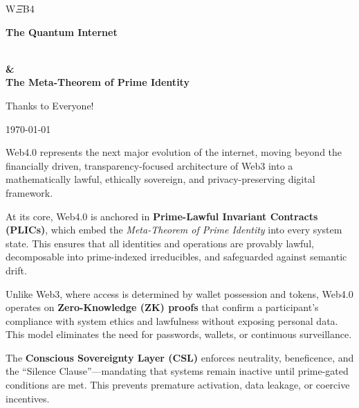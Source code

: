 \documentclass[12]{amsart}
\theoremstyle{plain}
\begin{document}
\begin{titlepage}
    \centering
 
    
    {\Huge\bfseries
    
   W$\Xi$B4

   \par}
\vspace*{1em}
  \Huge\textbf{The Quantum Internet}
   \vspace*{0.5em}
  {\LARGE\bfseries \\ \& \\The Meta-Theorem of Prime Identity \par}

    \vspace{2cm}

     \vspace{1cm}
     \Huge{Thanks to Everyone!  \par}
      \vspace{1cm}
    {\normalsize \today \par}

    \vfill

   
    \vspace{0.5em}
    \begin{minipage}{0.85\textwidth}
        \small
Web4.0 represents the next major evolution of the internet, moving beyond the financially driven, transparency-focused architecture of Web3 into a mathematically lawful, ethically sovereign, and privacy-preserving digital framework.

At its core, Web4.0 is anchored in \textbf{Prime-Lawful Invariant Contracts (PLICs)}, which embed the \emph{Meta-Theorem of Prime Identity} into every system state. This ensures that all identities and operations are provably lawful, decomposable into prime-indexed irreducibles, and safeguarded against semantic drift.

Unlike Web3, where access is determined by wallet possession and tokens, Web4.0 operates on \textbf{Zero-Knowledge (ZK) proofs} that confirm a participant's compliance with system ethics and lawfulness without exposing personal data. This model eliminates the need for passwords, wallets, or continuous surveillance.

The \textbf{Conscious Sovereignty Layer (CSL)} enforces neutrality, beneficence, and the ``Silence Clause''—mandating that systems remain inactive until prime-gated conditions are met. This prevents premature activation, data leakage, or coercive incentives.


\end{minipage}
\end{titlepage}
\end{document}
